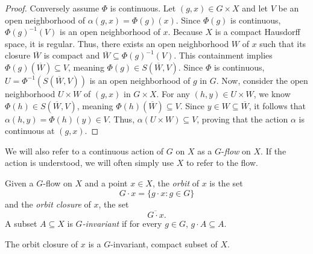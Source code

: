 \begin{proof}
    Conversely assume $\Phi$ is continuous. Let $(g, x) \in G \times X$ and let $V$ be an open neighborhood of $\alpha(g, x) = \Phi(g)(x)$. Since $\Phi(g)$ is continuous, $\Phi(g)^{-1}(V)$ is an open neighborhood of $x$.
    Because $X$ is a compact Hausdorff space, it is regular. Thus, there exists an open neighborhood $W$ of $x$ such that its closure $\overline{W}$ is compact and $\overline{W} \subseteq \Phi(g)^{-1}(V)$.
    This containment implies $\Phi(g)(\overline{W}) \subseteq V$, meaning $\Phi(g) \in S(\overline{W}, V)$.
    Since $\Phi$ is continuous, $U = \Phi^{-1}(S(\overline{W}, V))$ is an open neighborhood of $g$ in $G$.
    Now, consider the open neighborhood $U \times W$ of $(g, x)$ in $G \times X$. For any $(h, y) \in U \times W$, we know $\Phi(h) \in S(\overline{W}, V)$, meaning $\Phi(h)(\overline{W}) \subseteq V$. Since $y \in W \subseteq \overline{W}$, it follows that $\alpha(h, y) = \Phi(h)(y) \in V$.
    Thus, $\alpha(U \times W) \subseteq V$, proving that the action $\alpha$ is continuous at $(g, x)$.

\end{proof}



We will also refer to a continuous action of $G$ on $X$ as a $G$-{\it flow} on $X$. If the action is understood, we will often simply use $X$ to refer to the flow.

Given a $G$-flow on $X$ and a point $x\in X$, the {\it orbit} of $x$ is the
set
\[
    G\cdot x=\{g\cdot x:g\in G\}
\]
and the {\it orbit closure} of $x$, the set
\[
    \overline{G\cdot x}.
\]
A  subset $A \subseteq X$ is \textit{$G$-invariant} if for every $g \in G$, $g \cdot A \subseteq A$.


\begin{theorem}
    The  orbit closure of $x$ is a $G$-invariant, compact subset of $X$.
\end{theorem}


